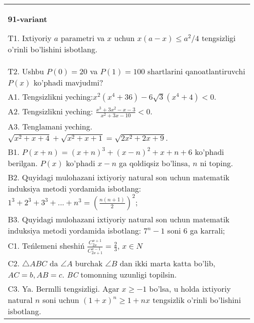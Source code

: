 \documentclass{article}
\begin{document}
\begin{tabular}{m{17cm}}
\textbf{91-variant}
\newline

T1. Ixtiyoriy \(a\) parametri va \(x\) uchun \(x(a - x) \leq a^{2}/4\) tengsizligi o'rinli bo'lishini isbotlang. \\
T2. Ushbu \(P(0) = 20\) va \(P(1) = 100\) shartlarini qanoatlantiruvchi \(P(x)\) ko'phadi mavjudmi? \\
A1. Tengsizlikni yeching:\(x^{2}\left( x^{4} + 36 \right) - 6\sqrt{3}\left( x^{4} + 4 \right) < 0\). \\
A2. Tengsizlikni yeching: \(\frac{x^{3} + 3x^{2} - x - 3}{x^{2} + 3x - 10} < 0\). \\
A3. Tenglamani yeching. \(\sqrt{x^{2} + x + 4} + \sqrt{x^{2} + x + 1} = \sqrt{2x^{2} + 2x + 9}\). \\
B1. \(P(x + n) = (x + n)^{3} + (x - n)^{2} + x + n + 6\) ko'phadi berilgan. \(P(x)\) ko'phadi \(x - n\) ga qoldiqsiz bo'linsa, \(n\) ni toping. \\
B2. Quyidagi mulohazani ixtiyoriy natural son uchun matematik induksiya metodi yordamida isbotlang: \(1^{3} + 2^{3} + 3^{3} + ... + n^{3} = \left( \frac{n(n + 1)}{2} \right)^{2}\); \\
B3. Quyidagi mulohazani ixtiyoriy natural son uchun matematik induksiya metodi yordamida isbotlang: \(7^{n} - 1\) soni 6 ga karrali; \\
C1. Teńlemeni sheshiń \(\frac{C_{2x}^{x + 1}}{C_{2x + 1}^{x - 1}} = \frac{2}{3}\), \(x \in N\) \\
C2. \(\bigtriangleup ABC\) da \(\angle A\) burchak \(\angle B\) dan ikki marta katta bo'lib, \(AC = b,AB = c\). \emph{BC} tomonning uzunligi topilsin. \\
C3. Ya. Bermlli tengsizligi. Agar \(x \geq - 1\) bo'lsa, u holda ixtiyoriy natural \(n\) soni uchun \((1 + x)^{n} \geq 1 + nx\) tengsizlik o'rinli bo'lishini isbotlang. \\

\end{tabular}
\vspace{1cm}
\end{document}
